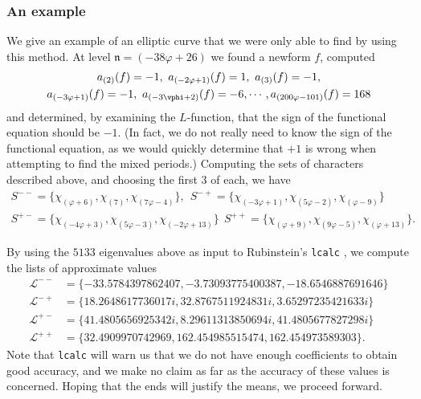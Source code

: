 \documentclass{amsart}
\newcommand{\n}{\mathfrak{n}}
\begin{document}
\subsubsection{An example}
We give an example of an elliptic curve that we were only able to find by using
this method. At level $\n = (-38\varphi + 26)$ we found a newform $f$, computed
\begin{multline*}
    a_{(2)}(f) = -1,\  a_{(-2\varphi + 1)}(f) = 1,\  a_{(3)}(f) = -1, \\ 
    a_{(-3\varphi + 1)}(f) = -1,\  a_{(-3\vphi + 2)}(f) = -6, \cdots, a_{(200\varphi - 101)}(f) = 168
\end{multline*}
and determined, by examining the $L$-function, that the sign of the functional equation
should be $-1$. (In fact, we do not really need to know the sign of the functional equation,
as we would quickly determine that $+1$ is wrong when attempting to find the mixed periods.)
Computing the sets of characters described above, and choosing the first $3$ of each, we
have
\begin{multline*}
S^{--} = \{\chi_{(\varphi + 6)}, \chi_{(7)}, \chi_{(7\varphi - 4)}\}, \ \ 
    S^{-+} = \{\chi_{(-3\varphi + 1)}, \chi_{(5 \varphi - 2)}, \chi_{(\varphi - 9)}\} \\
S^{+-} = \{\chi_{(-4\varphi + 3)}, \chi_{(5\varphi - 3)}, \chi_{(-2\varphi + 13)} \} \ \ 
    S^{++} = \{\chi_{(\varphi + 9)}, \chi_{(9\varphi - 5)}, \chi_{(\varphi + 13)} \}.
\end{multline*}

By using the $5133$ eigenvalues above as input to
Rubinstein's {\tt lcalc} \cite{lcalc}, we compute the lists of approximate
values
\[
\begin{split}
\mathcal{L}^{--} &= \{-33.5784397862407, -3.73093775400387, -18.6546887691646 \} \\ 
\mathcal{L}^{-+} &= \{18.2648617736017i, 32.8767511924831i, 3.65297235421633i \} \\
\mathcal{L}^{+-} &= \{41.4805656925342i, 8.29611313850694i, 41.4805677827298i\} \\
\mathcal{L}^{++} &= \{32.4909970742969, 162.454985515474, 162.454973589303\}.
\end{split}
\]
Note that {\tt lcalc} will warn us that we do not have enough coefficients to obtain good
accuracy, and we make no claim as far as the accuracy of these values is concerned.
Hoping that the ends will justify the means, we proceed forward.
\end{document}
